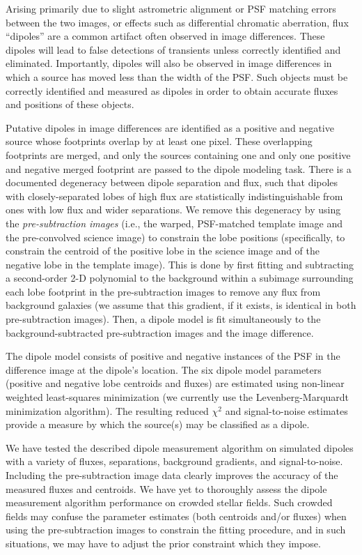 Arising primarily due to slight astrometric alignment or PSF matching errors between the two images, or effects such as differential chromatic aberration, flux “dipoles” are a common artifact often observed in image differences. These dipoles will lead to false detections of transients unless correctly identified and eliminated. Importantly, dipoles will also be observed in image differences in which a source has moved less than the width of the PSF. Such objects must be correctly identified and measured as dipoles in order to obtain accurate fluxes and positions of these objects.

Putative dipoles in image differences are identified as a positive and negative source whose footprints overlap by at least one pixel. These overlapping footprints are merged, and only the sources containing one and only one positive and negative merged footprint are passed to the dipole modeling task. There is a documented degeneracy  between dipole separation and flux, such that dipoles with closely-separated lobes of high flux are statistically indistinguishable from ones with low flux and wider separations. We remove this degeneracy by using the \emph{pre-subtraction images} (i.e., the warped, PSF-matched template image and the pre-convolved science image) to constrain the lobe positions (specifically, to constrain the centroid of the positive lobe in the science image and of the negative lobe in the template image). This is done by first fitting and subtracting a second-order 2-D polynomial to the background within a subimage surrounding each lobe footprint in the pre-subtraction images to remove any flux from background galaxies (we assume that this gradient, if it exists, is identical in both pre-subtraction images). Then, a dipole model is fit simultaneously to the background-subtracted pre-subtraction images and the image difference.

The dipole model consists of positive and negative instances of the PSF in the difference image at the dipole's location. The six dipole model parameters (positive and negative lobe centroids and fluxes) are estimated using non-linear weighted least-squares minimization (we currently use the Levenberg-Marquardt minimization algorithm). The resulting reduced $\chi^2$ and signal-to-noise estimates provide a measure by which the source(s) may be classified as a dipole.

We have tested the described dipole measurement algorithm on simulated dipoles with a variety of fluxes, separations, background gradients, and signal-to-noise. Including the pre-subtraction image data clearly improves the accuracy of the measured fluxes and centroids. We have yet to thoroughly assess the dipole measurement algorithm performance on crowded stellar fields. Such crowded fields may confuse the parameter estimates (both centroids and/or fluxes) when using the pre-subtraction images to constrain the fitting procedure, and in such situations, we may have to adjust the prior constraint which they impose.

